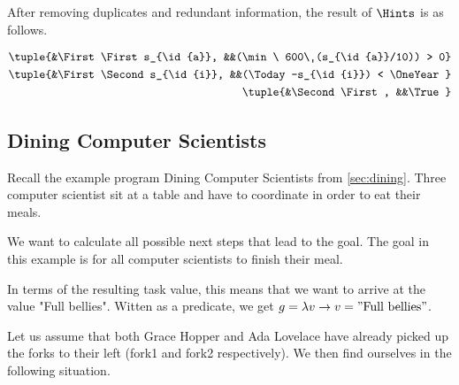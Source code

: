 After removing duplicates and redundant information, the result of $\Hints$ is as follows.

\begin{align*}
  \tuple{&\First \First s_{\id{a}},  &&(\min\ 600\ (s_{\id{a}}/10)) > 0} &\\
  \tuple{&\First \Second s_{\id{i}}, &&(\Today-s_{\id{i}}) < \OneYear} &\\
  \tuple{&\Second \First,            &&\True} &
\end{align*}



\subsection{Dining Computer Scientists}
\label{sub:assistive-dining}

Recall the example program Dining Computer Scientists from \cref{sec:dining}.
Three computer scientist sit at a table and have to coordinate in order to eat their meals.

We want to calculate all possible next steps that lead to the goal.
The goal in this example is for all computer scientists to finish their meal.

In terms of the resulting task value, this means that we want to arrive at the value "Full bellies".
Witten as a predicate, we get $g=\lambda v\rightarrow v = "\text{Full bellies}"$.

Let us assume that both Grace Hopper and Ada Lovelace have already picked up the forks to their left (fork1 and fork2 respectively).
We then find ourselves in the following situation.


